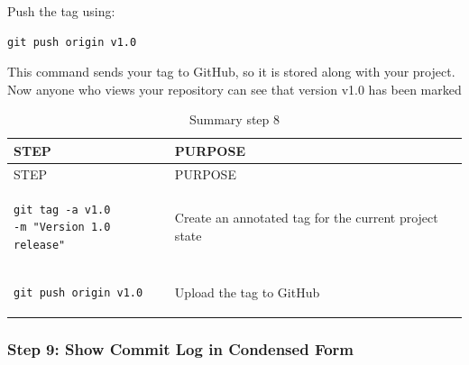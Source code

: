 \documentclass[
  11pt,
  a4paper,
]{article}
\begin{document}
Push the tag using:

\begin{verbatim}
git push origin v1.0 
\end{verbatim}

This command sends your tag to GitHub, so it is stored along with your
project. Now anyone who views your repository can see that version v1.0
has been marked

\begin{longtable}[]{@{}
  >{\raggedright\arraybackslash}p{}
  >{\raggedright\arraybackslash}p{}@{}}
\caption{Summary step 8}\tabularnewline
\toprule\noalign{}
\begin{minipage}[b]{\linewidth}\raggedright
STEP
\end{minipage} & \begin{minipage}[b]{\linewidth}\raggedright
PURPOSE
\end{minipage} \\
\midrule\noalign{}
\endfirsthead
\toprule\noalign{}
\begin{minipage}[b]{\linewidth}\raggedright
STEP
\end{minipage} & \begin{minipage}[b]{\linewidth}\raggedright
PURPOSE
\end{minipage} \\
\midrule\noalign{}
\endhead
\bottomrule\noalign{}
\endlastfoot
\begin{minipage}[t]{\linewidth}\raggedright
\begin{verbatim}
git tag -a v1.0
-m "Version 1.0 release"
\end{verbatim}
\end{minipage} & Create an annotated tag for the current project
state \\
\begin{minipage}[t]{\linewidth}\raggedright
\begin{verbatim}
git push origin v1.0
\end{verbatim}
\end{minipage} & Upload the tag to GitHub \\
\end{longtable}

\newpage

\subsubsection{Step 9: Show Commit Log in Condensed
Form}\label{step-9-show-commit-log-in-condensed-form}
\end{document}
